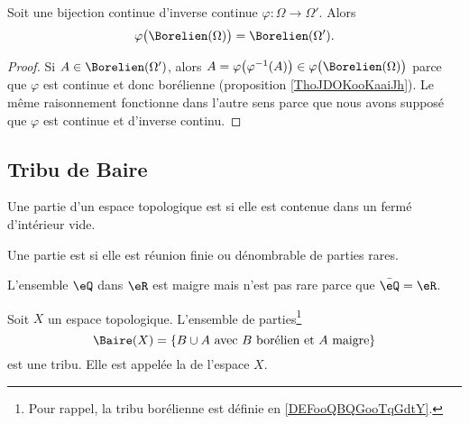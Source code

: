 \begin{proposition}     \label{PROPooIKYYooCFaDaI}
	Soit une bijection continue d'inverse continue \( \varphi\colon \Omega\to \Omega'\). Alors
	\begin{equation}
		\varphi\big( \Borelien(\Omega) \big)=\Borelien(\Omega').
	\end{equation}
\end{proposition}

\begin{proof}
	Si \( A\in \Borelien(\Omega')\), alors \( A=\varphi\big( \varphi^{-1}(A) \big)\in\varphi\big( \Borelien(\Omega) \big)\) parce que \( \varphi\) est continue et donc borélienne (proposition \ref{ThoJDOKooKaaiJh}). Le même raisonnement fonctionne dans l'autre sens parce que nous avons supposé que \( \varphi\) est continue et d'inverse continu.
\end{proof}

\subsection{Tribu de Baire}

\begin{definition}
	Une partie d'un espace topologique est  si elle est contenue dans un fermé d'intérieur vide.

	Une partie est  si elle est réunion finie ou dénombrable de parties rares.
\end{definition}

\begin{example}
	L'ensemble \( \eQ\) dans \( \eR\) est maigre mais n'est pas rare parce que \( \bar\eQ=\eR\).
\end{example}

\begin{proposition}      \label{PROPooCHTWooZFiSMf}
	Soit \( X\) un espace topologique. L'ensemble de parties\footnote{Pour rappel, la tribu borélienne est définie en \ref{DEFooQBQGooTqGdtY}.}
	\begin{equation}
		\Baire(X)=\{ B\cup A\text{ avec } B\text{ borélien et } A\text{ maigre} \}
	\end{equation}
	est une tribu. Elle est appelée la  de l'espace \( X\).
\end{proposition}


